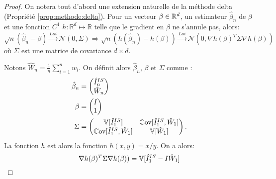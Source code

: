 \begin{proof}
On notera tout d'abord une extension naturelle de la méthode delta (Propriété \ref{prop:methode:delta}). Pour un vecteur $\beta \in \mathbb{R}^d$, un estimateur $\hat{\beta}_n$ de $\beta$ et une fonction $C^1$ $h: \mathbb{R}^d \mapsto \mathbb{R}$ telle que le gradient en $\beta$ ne s'annule pas, alors:
$$\sqrt{n}\left(\hat{\beta}_n - \beta \right) \overset{Loi}{\longrightarrow} \mathcal{N}(0, \Sigma) \Rightarrow \sqrt{n}\left(h(\hat{\beta}_n) - h(\beta) \right) \overset{Loi}{\longrightarrow} \mathcal{N}(0, \nabla h(\beta)^T\Sigma \nabla h(\beta))$$
où $\Sigma$ est une matrice de covariance $d\times d$.

Notons $\hat{W}_n = \frac{1}{n}\sum_{i = 1}^n w_i$. On définit alors $\hat{\beta}_n$, $\beta$ et $\Sigma$ comme :
\begin{align*}
\hat{\beta}_n &= \begin{pmatrix}
\hat{I}_n^{IS}\\
\hat{W}_n
\end{pmatrix}\\
\beta &= \begin{pmatrix}
I\\
1
\end{pmatrix}\\
\Sigma &= \begin{pmatrix}
\mathbb{V}[\hat{I}_1^{IS}] & \mathbb{C}\text{ov}[\hat{I}_1^{IS}, \hat{W}_1]\\
\mathbb{C}\text{ov}[\hat{I}_1^{IS}, \hat{W}_1] & \mathbb{V}[\hat{W}_1]
\end{pmatrix}.
\end{align*}
La fonction $h$ est alors la fonction $h(x,y) = x / y$. On a alors:
$$\nabla h(\beta)^T\Sigma \nabla h(\beta)) = \mathbb{V}[\hat{I}_1^{IS} - I \hat{W}_1]$$ 
\end{proof}
